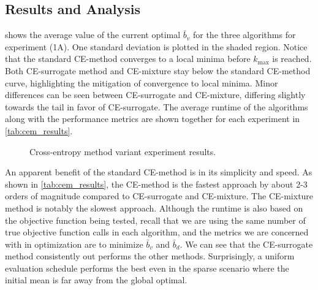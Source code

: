 \subsection{Results and Analysis} \label{sec:cem_results}

 shows the average value of the current optimal $\bar{b}_v$ for the three algorithms for experiment (1A). 
One standard deviation is plotted in the shaded region.
Notice that the standard CE-method converges to a local minima before $k_\text{max}$ is reached.
Both CE-surrogate method and CE-mixture stay below the standard CE-method curve, highlighting the mitigation of convergence to local minima.
Minor differences can be seen between CE-surrogate and CE-mixture, differing slightly towards the tail in favor of CE-surrogate.
The average runtime of the algorithms along with the performance metrics are shown together for each experiment in \cref{tab:cem_results}.

\begin{figure*}[ht]
    \centering
    \hspace{2mm}
    \hspace{2mm}
    \caption{Cross-entropy method variant experiment results.}\label{fig:cem_experiments}
\end{figure*}


An apparent benefit of the standard CE-method is in its simplicity and speed.
As shown in \cref{tab:cem_results}, the CE-method is the fastest approach by about 2-3 orders of magnitude compared to CE-surrogate and CE-mixture.
The CE-mixture method is notably the slowest approach.
Although the runtime is also based on the objective function being tested, recall that we are using the same number of true objective function calls in each algorithm, and the metrics we are concerned with in optimization are to minimize $\bar{b}_v$ and $\bar{b}_d$.
We can see that the CE-surrogate method consistently out performs the other methods.
Surprisingly, a uniform evaluation schedule performs the best even in the sparse scenario where the initial mean is far away from the global optimal.


